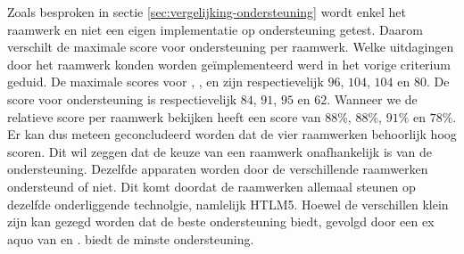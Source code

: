 \begin{table}[H]
\centering
{}
\caption{Overzicht van ondersteuning per apparaat.}
\label{tabel:evaluatie-ondersteuning-a}
\end{table}

Zoals besproken in sectie \ref{sec:vergelijking-ondersteuning} wordt enkel het raamwerk en niet een eigen implementatie op ondersteuning getest.
Daarom verschilt de maximale score voor ondersteuning per raamwerk.
Welke uitdagingen door het raamwerk konden worden geïmplementeerd werd in het vorige criterium geduid.
De maximale scores voor \st{},  \kendo{},  \jqm{} en \lungo{} zijn respectievelijk $96$, $104$, $104$ en $80$.
De score voor ondersteuning is respectievelijk $84$, $91$, $95$ en $62$.
Wanneer we de relatieve score per raamwerk bekijken heeft \st{} een score van $88\%$,  \kendo{} $88\%$,  \jqm{} $91\%$ en \lungo $78\%$.
Er kan dus meteen geconcludeerd worden dat de vier raamwerken behoorlijk hoog scoren.
Dit wil zeggen dat de keuze van een raamwerk onafhankelijk is van de ondersteuning.
Dezelfde apparaten worden door de verschillende raamwerken ondersteund of niet.
Dit komt doordat de raamwerken allemaal steunen op dezelfde onderliggende technolgie, namlelijk HTLM5.
Hoewel de verschillen klein zijn kan gezegd worden dat \jqm{} de beste ondersteuning biedt,  gevolgd door een ex aquo van \st{} en \kendo{}.
\lungo{} biedt de minste ondersteuning.

